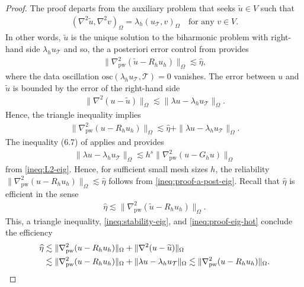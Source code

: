 \documentclass[a4paper]{amsart}
\numberwithin{equation}{section}
\def\T{\mathcal{T}}
\def\pw{\mathrm{pw}}
\theoremstyle{definition}
\theoremstyle{remark}
\numberwithin{theorem}{section}
\numberwithin{equation}{section}
\numberwithin{table}{section}
\numberwithin{figure}{section}
\begin{document}
\begin{proof}
	The proof departs from the auxiliary problem that seeks $\widetilde{u} \in V$ such that
	\begin{align*}
		(\nabla^2 \widetilde{u}, \nabla^2 v)_\Omega = \lambda_h(u_\T, v)_\Omega \quad\text{for any } v \in V.
	\end{align*}
	In other words, $\widetilde{u}$ is the unique solution to the biharmonic problem with right-hand side $\lambda_h u_\T$ and so, the a posteriori error control from  provides
	\begin{align*}
		\|\nabla^2_\pw(\widetilde{u} - R_h u_h)\|_\Omega \lesssim \widehat{\eta},
	\end{align*}
	where the data oscillation $\mathrm{osc}(\lambda_h u_\T, \T) = 0$ vanishes.
	The error between $u$ and $\widetilde{u}$ is bounded by the error of the right-hand side
	\begin{align}\label{ineq:stability-eig}
		\|\nabla^2(u - \widetilde{u})\|_\Omega \lesssim \|\lambda u - \lambda_h u_\T\|_\Omega.
	\end{align}
	Hence, the triangle inequality implies
	\begin{align}\label{ineq:proof-a-post-eig}
		\|\nabla^2_\pw(u - R_h u_h)\|_\Omega \lesssim \widehat{\eta} + \|\lambda u - \lambda_h u_\T\|_\Omega.
	\end{align}
	The inequality (6.7) of \cite{CarstensenGraessleTran2024} applies and provides
	\begin{align}\label{ineq:proof-eig-hot}
		\|\lambda u - \lambda_h u_\T\|_\Omega \lesssim h^s\|\nabla_\pw^2(u - G_h u)\|_\Omega
	\end{align}
	from \eqref{ineq:L2-eig}.
	Hence, for sufficient small mesh sizes $h$, the reliability $\|\nabla^2_\pw(u - R_h u_h)\|_\Omega \lesssim \widehat{\eta}$ follows from \eqref{ineq:proof-a-post-eig}.
	Recall that $\widehat{\eta}$ is efficient in the sense
	\begin{align*}
		\widehat{\eta} \lesssim \|\nabla_\pw^2(\widetilde{u} - R_h u_h)\|_\Omega.
	\end{align*}
	This, a triangle inequality, \eqref{ineq:stability-eig}, and \eqref{ineq:proof-eig-hot} conclude the efficiency
	\begin{align*}
		\widehat{\eta} &\lesssim \|\nabla_\pw^2(u - R_h u_h)\|_\Omega + \|\nabla^2(u - \widetilde{u})\|_\Omega\\
		& \lesssim \|\nabla_\pw^2(u - R_h u_h)\|_\Omega + \|\lambda u - \lambda_h u_\T\|_\Omega \lesssim \|\nabla_\pw^2(u - R_h u_h)\|_\Omega.\qedhere
	\end{align*}
\end{proof}
\end{document}
